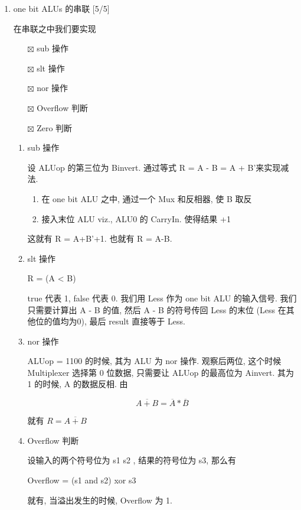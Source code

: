 \documentclass[11pt]{ctexart}
\begin{document}
\begin{enumerate}
\begin{enumerate}
\item one bit ALUs 的串联 [5/5]
\label{sec:org23195f6}

在串联之中我们要实现
\begin{itemize}
\item[{$\boxtimes$}] sub 操作
\item[{$\boxtimes$}] slt 操作
\item[{$\boxtimes$}] nor 操作
\item[{$\boxtimes$}] Overflow 判断
\item[{$\boxtimes$}] Zero 判断
\end{itemize}

\begin{enumerate}
\item sub 操作
\label{sec:org5f9a8a0}

设 ALUop 的第三位为 Binvert. 通过等式 R = A - B = A + B'来实现减法.

\begin{enumerate}
\item 在 one bit ALU 之中, 通过一个 Mux 和反相器, 使 B 取反
\item 接入末位 ALU viz., ALU0 的 CarryIn. 使得结果 +1
\end{enumerate}

这就有 R = A+B'+1. 也就有 R = A-B. 

\item slt 操作
\label{sec:org344e795}

R = (A < B) 

true 代表 1, false 代表 0. 我们用 Less 作为 one bit ALU 的输入信号. 
我们只需要计算出 A - B 的值, 然后 A - B 的符号传回 Less 的末位 (Less
在其他位的值均为0), 最后 result 直接等于 Less.  

\item nor 操作
\label{sec:org0499db3}

ALUop = 1100 的时候, 其为 ALU 为 nor 操作. 观察后两位, 这个时候
Multiplexer 选择第 0 位数据, 只需要让 ALUop 的最高位为 Ainvert. 其为 1
的时候, A 的数据反相. 由

$$
\overline {A + B} = \overline A * \overline B
$$

就有 $ R = \overline{A + B} $

\item Overflow 判断
\label{sec:org5aabda3}

设输入的两个符号位为 s1 s2 , 结果的符号位为 s3, 那么有

Overflow = (s1 and s2) xor s3

就有, 当溢出发生的时候, Overflow 为 1.


\end{enumerate}
\end{enumerate}
\end{enumerate}
\end{document}
